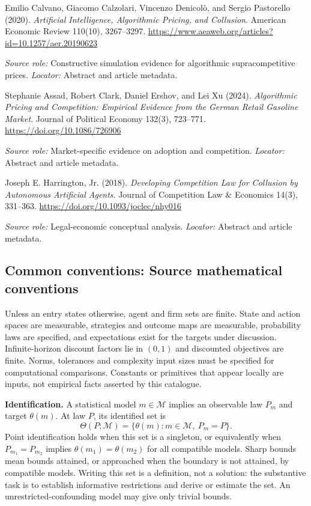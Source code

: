 \documentclass[11pt,a4paper]{article}
\begin{document}
\begin{enumerate}[label={[S\arabic*]},leftmargin=*]

\item Emilio Calvano, Giacomo Calzolari, Vincenzo Denicolò, and Sergio Pastorello (2020). \emph{Artificial Intelligence, Algorithmic Pricing, and Collusion}. American Economic Review 110(10), 3267--3297. \url{https://www.aeaweb.org/articles?id=10.1257/aer.20190623}\par \textit{Source role:} Constructive simulation evidence for algorithmic supracompetitive prices. \textit{Locator:} Abstract and article metadata.

\item Stephanie Assad, Robert Clark, Daniel Ershov, and Lei Xu (2024). \emph{Algorithmic Pricing and Competition: Empirical Evidence from the German Retail Gasoline Market}. Journal of Political Economy 132(3), 723--771. \url{https://doi.org/10.1086/726906}\par \textit{Source role:} Market-specific evidence on adoption and competition. \textit{Locator:} Abstract and article metadata.

\item Joseph E. Harrington, Jr. (2018). \emph{Developing Competition Law for Collusion by Autonomous Artificial Agents}. Journal of Competition Law \& Economics 14(3), 331--363. \url{https://doi.org/10.1093/joclec/nhy016}\par \textit{Source role:} Legal-economic conceptual analysis. \textit{Locator:} Abstract and article metadata.

\end{enumerate}

\subsection*{Common conventions: Source mathematical conventions}

Unless an entry states otherwise, agent and firm sets are finite. State and action spaces are measurable, strategies and outcome maps are measurable, probability laws are specified, and expectations exist for the targets under discussion. Infinite-horizon discount factors lie in $(0,1)$ and discounted objectives are finite. Norms, tolerances and complexity input sizes must be specified for computational comparisons. Constants or primitives that appear locally are inputs, not empirical facts asserted by this catalogue.

\textbf{Identification.} A statistical model $m\in\mathcal M$ implies an observable law $P_m$ and target $\theta(m)$. At law $P$, its identified set is
\[
\Theta(P;\mathcal M)=\{\theta(m):m\in\mathcal M,\ P_m=P\}.
\]
Point identification holds when this set is a singleton, or equivalently when $P_{m_1}=P_{m_2}$ implies $\theta(m_1)=\theta(m_2)$ for all compatible models. Sharp bounds mean bounds attained, or approached when the boundary is not attained, by compatible models. Writing this set is a definition, not a solution: the substantive task is to establish informative restrictions and derive or estimate the set. An unrestricted-confounding model may give only trivial bounds.
\end{document}
